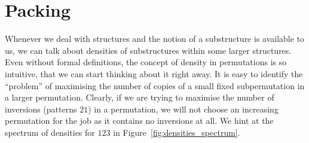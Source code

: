 \documentclass[12pt, a4paper, twoside]{report}
\begin{document}
\part{Packing} %
\label{part:packing}
%

Whenever we deal with structures and the notion of a substructure is available to us, we can talk about densities of substructures within some larger structures. Even without formal definitions, the concept of density in permutations is so intuitive, that we can start thinking about it right away. It is easy to identify the ``problem'' of maximising the number of copies of a small fixed subpermutation in a larger permutation. Clearly, if we are trying to maximise the number of inversions (patterns $21$) in a permutation, we will not choose an increasing permutation for the job as it contains no inversions at all. We hint at the spectrum of densities for $123$ in Figure~\ref{fig:densities_spectrum}.
\end{document}
